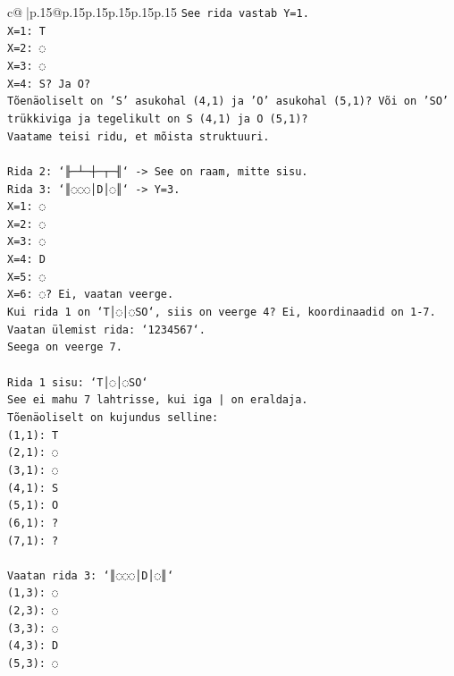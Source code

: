 \documentclass{article}
\begin{document}
{\begin{supertabular}{c@{$\;$}|p{.15\linewidth}@{}p{.15\linewidth}p{.15\linewidth}p{.15\linewidth}p{.15\linewidth}p{.15\linewidth}}
{{{\texttt{See rida vastab Y=1.} \\
\texttt{X=1: T} \\
\texttt{X=2: ◌} \\
\texttt{X=3: ◌} \\
\texttt{X=4: S? Ja O?} \\
\texttt{Tõenäoliselt on 'S' asukohal (4,1) ja 'O' asukohal (5,1)? Või on 'SO' trükkiviga ja tegelikult on S (4,1) ja O (5,1)?} \\
\texttt{Vaatame teisi ridu, et mõista struktuuri.} \\
\\ 
\texttt{Rida 2: `╟─┴─┼─┬─╢` {-}> See on raam, mitte sisu.} \\
\texttt{Rida 3: `║◌◌◌│D│◌║` {-}> Y=3.} \\
\texttt{X=1: ◌} \\
\texttt{X=2: ◌} \\
\texttt{X=3: ◌} \\
\texttt{X=4: D} \\
\texttt{X=5: ◌} \\
\texttt{X=6: ◌? Ei, vaatan veerge.} \\
\texttt{Kui rida 1 on `T│◌│◌SO`, siis on veerge 4? Ei, koordinaadid on 1{-}7.} \\
\texttt{Vaatan ülemist rida: `1234567`.} \\
\texttt{Seega on veerge 7.} \\
\\ 
\texttt{Rida 1 sisu: `T│◌│◌SO`} \\
\texttt{See ei mahu 7 lahtrisse, kui iga | on eraldaja.} \\
\texttt{Tõenäoliselt on kujundus selline:} \\
\texttt{(1,1): T} \\
\texttt{(2,1): ◌} \\
\texttt{(3,1): ◌} \\
\texttt{(4,1): S} \\
\texttt{(5,1): O} \\
\texttt{(6,1): ?} \\
\texttt{(7,1): ?} \\
\\ 
\texttt{Vaatan rida 3: `║◌◌◌│D│◌║`} \\
\texttt{(1,3): ◌} \\
\texttt{(2,3): ◌} \\
\texttt{(3,3): ◌} \\
\texttt{(4,3): D} \\
\texttt{(5,3): ◌} \\
}}}
\end{supertabular}}
\end{document}
